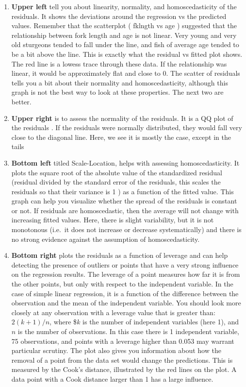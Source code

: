 \documentclass[
  12pt,
]{book}
\providecommand{\tightlist}{%
  \setlength{\itemsep}{0pt}\setlength{\parskip}{0pt}}
\begin{document}
\begin{enumerate}
\def\labelenumi{\arabic{enumi}.}
\tightlist
\item
  \textbf{Upper left} tell you about linearity, normality, and homoscedasticity of the residuals. It shows the deviations around the regression vs the predicted values. Remember that the scatterplot ( fklngth vs age ) suggested that the relationship between fork length and age is not linear. Very young and very old sturgeons tended to fall under the line, and fish of average age tended to be a bit above the line. This is exactly what the residual vs fitted plot shows. The red line is a lowess trace through these data. If the relationship was linear, it would be approximately flat and close to 0. The scatter of residuals tells you a bit about their normality and homoscedasticity, although this graph is not the best way to look at these properties. The next two are better.
\item
  \textbf{Upper right} is to assess the normality of the residuals. It is a QQ plot of the residuals . If the residuals were normally distributed, they would fall very close to the diagonal line. Here, we see it is mostly the case, except in the tails
\item
  \textbf{Bottom left} titled Scale-Location, helps with assessing homoscedasticity. It plots the square root of the absolute value of the standardized residual (residual divided by the standard error of the residuals, this scales the residuals so that their variance is 1 ) as a function of the fitted value. This graph can help you visualize whether the spread of the residuals is constant or not. If residuals are homoscedastic, then the average will not change with increasing fitted values. Here, there is slight variability, but it is not monotonous (i.e.~it does not increase or decrease systematically) and there is no strong evidence against the assumption of homoscedasticity.
\item
  \textbf{Bottom right} plots the residuals as a function of leverage and can help detecting the presence of outliers or points that have a very strong influence on the regression results. The leverage of a point measures how far it is from the other points, but only with respect to the independent variable. In the case of simple linear regression, it is a function of the difference between the observation and the mean of the independent variable. You should look more closely at any observation with a leverage value that is greater than: \(2(k+1)/n\), where \$\(k\) is the number of independent variables (here 1), and \(n\) is the number of observations. In this case there is 1 independent variable, 75 observations, and points with a leverage higher than 0.053 may warrant particular scrutiny. The plot also gives you information about how the removal of a point from the data set would change the predictions. This is measured by the Cook's distance, illustrated by the red lines on the plot. A data point with a Cook distance larger than 1 has a large influence.
\end{enumerate}
\end{document}
